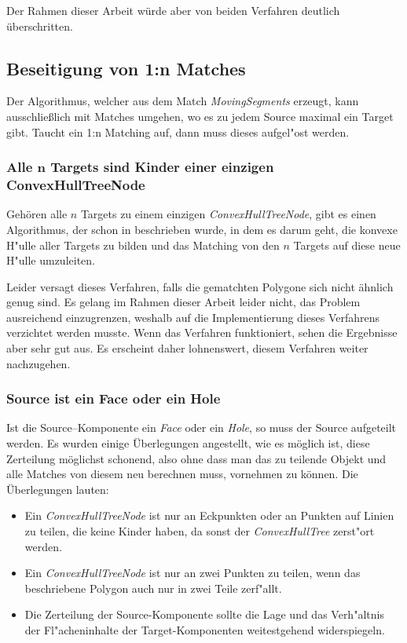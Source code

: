 Der Rahmen dieser Arbeit würde aber von beiden Verfahren deutlich überschritten.

\subsection{Beseitigung von 1:n Matches}\label{1zuN}

Der Algorithmus, welcher aus dem Match \textit{MovingSegments} erzeugt, kann ausschließlich mit Matches umgehen, wo es zu jedem Source maximal ein Target gibt. Taucht ein 1:n Matching auf, dann muss dieses aufgel"ost werden. 

\subsubsection*{Alle $\mathbf{n}$ Targets sind Kinder einer einzigen ConvexHullTreeNode}\label{JoinConc}

Gehören alle $n$ Targets zu einem einzigen \textit{ConvexHullTreeNode}, gibt es einen Algorithmus, der schon in \cite{TG} beschrieben wurde, in dem es darum geht, die konvexe H"ulle aller Targets zu bilden und das Matching von den $n$ Targets auf diese neue H"ulle umzuleiten.

Leider versagt dieses Verfahren, falls die gematchten Polygone sich nicht ähnlich genug sind. Es gelang im Rahmen dieser Arbeit leider nicht, das Problem ausreichend einzugrenzen, weshalb auf die Implementierung dieses Verfahrens verzichtet werden musste. Wenn das Verfahren funktioniert, sehen die Ergebnisse aber sehr gut aus. Es erscheint daher lohnenswert, diesem Verfahren weiter nachzugehen.

\subsubsection*{Source ist ein Face oder ein Hole}

Ist die Source--Komponente ein \textit{Face} oder ein \textit{Hole},  so muss der Source aufgeteilt werden. Es wurden einige Überlegungen angestellt, wie es möglich ist, diese Zerteilung möglichst schonend, also ohne dass man das zu teilende Objekt und alle Matches von diesem neu berechnen muss, vornehmen zu können. Die Überlegungen lauten:
\begin{itemize}
\item Ein \textit{ConvexHullTreeNode} ist nur an Eckpunkten oder an Punkten auf Linien zu teilen, die keine Kinder haben, da sonst der \textit{ConvexHullTree} zerst"ort werden.

\item Ein \textit{ConvexHullTreeNode} ist nur an zwei Punkten zu teilen, wenn das beschriebene Polygon auch nur in zwei Teile zerf"allt.

\item Die Zerteilung der Source-Komponente sollte die Lage und das Verh"altnis der Fl"acheninhalte der Target-Komponenten weitestgehend widerspiegeln.

\end{itemize} 

